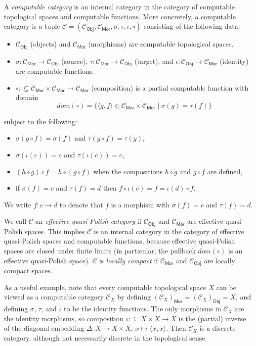 \documentclass[envcountsame]{llncs}
\def\calC{{\mathcal{C}}}
\newcommand{\Mor}{\mathsf{Mor}}
\newcommand{\Obj}{\mathsf{Obj}}
\def\src{{\sigma}}
\def\tar{{\tau}}
\def\id{{\iota}}
\begin{document}
A \emph{computable category} is an internal category \cite{J99} in the category of computable topological spaces and computable functions. More concretely, a computable category is a tuple $\calC = (\calC_\Obj, \calC_\Mor, \src,\tar,\id,\circ)$ consisting of the following data:
\begin{itemize}
\item
$\calC_\Obj$ (objects) and $\calC_\Mor$ (morphisms) are computable topological spaces.
\item
$\src\colon \calC_\Mor\to\calC_\Obj$ (source), $\tar\colon \calC_\Mor\to\calC_\Obj$ (target), and $\id\colon \calC_\Obj\to\calC_\Mor$ (identity) are computable functions.
\item
$\circ:\subseteq \calC_\Mor\times\calC_\Mor\to\calC_\Mor$ (composition) is a partial computable function with domain
\[dom(\circ) = \{ \langle g,f \rangle \in \calC_\Mor\times\calC_\Mor \mid \src(g) = \tar(f)\}\]
\end{itemize}
subject to the following:
\begin{itemize}
\item
$\src(g\circ f) = \src(f)$ and $\tar(g\circ f) = \tar(g)$,
\item
$\src(\id(c)) = c$ and $\tar(\id(c)) = c$,
\item
$(h\circ g)\circ f = h \circ (g\circ f)$ when the compositions $h\circ g$ and $g\circ f$ are defined,
\item
if $\src(f) = c$ and $\tar(f) = d$ then $f\circ \id(c) = f = \id(d)\circ f $.
\end{itemize}
We write $f\colon c\to d$ to denote that $f$ is a morphism with  $\src(f) = c$ and $\tar(f) = d$.

We call $\calC$ an \emph{effective quasi-Polish category} if $\calC_\Obj$ and $\calC_\Mor$ are effective quasi-Polish spaces. This implies $\calC$ is an internal category in the category of effective quasi-Polish spaces and computable functions, because effective quasi-Polish spaces are closed under finite limits (in particular, the pullback $dom(\circ)$ is an effective quasi-Polish space). $\calC$ is \emph{locally compact} if $\calC_\Mor$ and $\calC_\Obj$ are locally compact spaces.

As a useful example, note that every computable topological space $X$ can be viewed as a computable category $\calC_X$ by defining $(\calC_X)_\Mor = (\calC_X)_\Obj = X$, and defining $\src$, $\tar$, and $\id$ to be the identity functions. The only morphisms in $\calC_X$ are the identity morphisms, so composition $\circ:\subseteq X\times X \to X$ is the (partial) inverse of the diagonal embedding $\Delta\colon X\to X\times X$, $x\mapsto \langle x,x\rangle$. Then $\calC_X$ is a discrete category, although not necessarily discrete in the topological sense.
\end{document}
